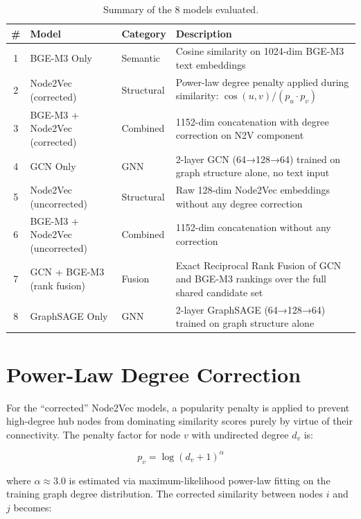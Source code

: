 \documentclass[12pt,a4paper]{article}
\begin{document}
\begin{table}[H]
\centering
\caption{Summary of the 8 models evaluated.}
\label{tab:models}
\begin{tabular}{cllp{7cm}}
\toprule
\textbf{\#} & \textbf{Model} & \textbf{Category} & \textbf{Description} \\
\midrule
1 & BGE-M3 Only & Semantic & Cosine similarity on 1024-dim BGE-M3 text embeddings \\
2 & Node2Vec (corrected) & Structural & Power-law degree penalty applied during similarity: $\cos(u,v) / (p_u \cdot p_v)$ \\
3 & BGE-M3 + Node2Vec (corrected) & Combined & 1152-dim concatenation with degree correction on N2V component \\
4 & GCN Only & GNN & 2-layer GCN (64→128→64) trained on graph structure alone, no text input \\
5 & Node2Vec (uncorrected) & Structural & Raw 128-dim Node2Vec embeddings without any degree correction \\
6 & BGE-M3 + Node2Vec (uncorrected) & Combined & 1152-dim concatenation without any correction \\
7 & GCN + BGE-M3 (rank fusion) & Fusion & Exact Reciprocal Rank Fusion of GCN and BGE-M3 rankings over the full shared candidate set \\
8 & GraphSAGE Only & GNN & 2-layer GraphSAGE (64→128→64) trained on graph structure alone \\
\bottomrule
\end{tabular}
\end{table}

\section{Power-Law Degree Correction}

For the ``corrected'' Node2Vec models, a popularity penalty is applied to prevent
high-degree hub nodes from dominating similarity scores purely by virtue of their
connectivity.  The penalty factor for node $v$ with undirected degree $d_v$ is:

\[
p_v = \log(d_v + 1)^{\alpha}
\]

where $\alpha \approx 3.0$ is estimated via maximum-likelihood power-law fitting
on the training graph degree distribution.  The corrected similarity between nodes
$i$ and $j$ becomes:
\end{document}
